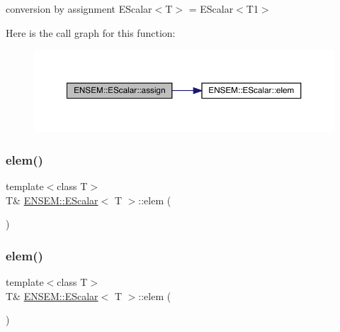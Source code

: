 conversion by assignment E\+Scalar$<$\+T$>$ = E\+Scalar$<$\+T1$>$ 

Here is the call graph for this function\+:
\nopagebreak
\begin{figure}[H]
\begin{center}
\leavevmode
\includegraphics[width=350pt]{d0/d82/classENSEM_1_1EScalar_aa9a54e03830d13eb6a124c64c6a46dd1_cgraph}
\end{center}
\end{figure}
\mbox{\label{classENSEM_1_1EScalar_a8de3b840367731efc862fc6943119152}} 
\subsubsection{\texorpdfstring{elem()}{elem()}\hspace{0.1cm}{\footnotesize\ttfamily [1/4]}}
{\footnotesize\ttfamily template$<$class T$>$ \\
T\& \mbox{\hyperlink{classENSEM_1_1EScalar}{E\+N\+S\+E\+M\+::\+E\+Scalar}}$<$ T $>$\+::elem (\begin{DoxyParamCaption}{ }\end{DoxyParamCaption})\hspace{0.3cm}{\ttfamily [inline]}}

\mbox{\label{classENSEM_1_1EScalar_a8de3b840367731efc862fc6943119152}} 
\subsubsection{\texorpdfstring{elem()}{elem()}\hspace{0.1cm}{\footnotesize\ttfamily [2/4]}}
{\footnotesize\ttfamily template$<$class T$>$ \\
T\& \mbox{\hyperlink{classENSEM_1_1EScalar}{E\+N\+S\+E\+M\+::\+E\+Scalar}}$<$ T $>$\+::elem (\begin{DoxyParamCaption}{ }\end{DoxyParamCaption})\hspace{0.3cm}{\ttfamily [inline]}}

